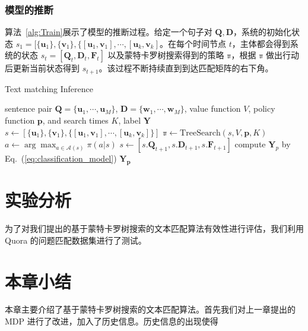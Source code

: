 \subsubsection{模型的推断}
算法~\ref{alg:Train}展示了模型的推断过程。给定一个句子对 $\mathbf{Q}, \mathbf{D}$，系统的初始化状态 $s_1=[\{\mathbf{u}_1\}, \{\mathbf{v}_1\}, \{[\mathbf{u}_1,\mathbf{v}_1], \cdots, [\mathbf{u}_k, \mathbf{v}_k]$。在每个时间节点 $t$，主体都会得到系统的状态 $s_t=[\mathbf{Q}_t, \mathbf{D}_t, \mathbf{F}_t]$ 以及蒙特卡罗树搜索得到的策略 $\mathbb{\pi}$，根据 $\mathbb{\pi}$ 做出行动后更新当前状态得到 $s_{t+1}$。该过程不断持续直到到达匹配矩阵的右下角。

\begin{algorithm}[!htbp]
\caption{Text matching Inference}\label{alg:RLRank_MCTS}
\renewcommand{\algorithmicrequire}{\textbf{Input:}}
\renewcommand{\algorithmicensure}{\textbf{Output:}}
\begin{algorithmic}[1]
\Require sentence pair $\mathbf{Q}=\{\mathbf{u}_1, \cdots, \mathbf{u}_M\}$, $\mathbf{D}=\{\mathbf{w}_1, \cdots, \mathbf{w}_M\}$, value function $V$, policy function $\mathbf{p}$, and search times $K$,
\Ensure label $\mathbf{Y}$
\State $s \leftarrow [\{\mathbf{u}_1\}, \{\mathbf{v}_1\}, \{[\mathbf{u}_1,\mathbf{v}_1], \cdots, [\mathbf{u}_k, \mathbf{v}_k]\}]$
  \State $\mathbb{\pi} \leftarrow \mathrm{TreeSearch}(s, V, \mathbf{p}, K)$
  \State $a \leftarrow \arg\max_{a\in\mathcal{A}(s)} \pi(a|s)$
  \State $s \leftarrow [s.\mathbf{Q}_{t+1}, s.\mathbf{D}_{t+1}, s.\mathbf{F}_{t+1}]$
\EndWhile
\State compute $\mathbf{Y}_p$ by Eq.~(\ref{eq:classification_model})
\State \Return $\mathbf{Y_p}$
\end{algorithmic}
\end{algorithm}


\section{实验分析}
为了对我们提出的基于蒙特卡罗树搜索的文本匹配算法有效性进行评估，我们利用 Quora 的问题匹配数据集进行了测试。

\section{本章小结}
本章主要介绍了基于蒙特卡罗树搜索的文本匹配算法。首先我们对上一章提出的 MDP 进行了改进，加入了历史信息。历史信息的出现使得
